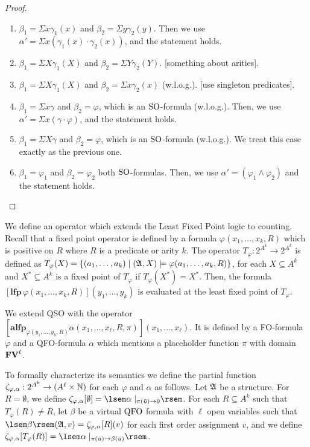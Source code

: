 \begin{proof}
\begin{enumerate}
		\begin{enumerate}
			\item $\beta_1 = \Sigma x \gamma_1(x)$ and $\beta_2 = \Sigma y \gamma_2(y)$. Then we use $\alpha' = \Sigma x(\gamma_1(x)\cdot\gamma_2(x))$, and the statement holds.
			\item $\beta_1 = \Sigma X \gamma_1(X)$ and $\beta_2 = \Sigma Y \gamma_2(Y)$. [something about arities].
			\item $\beta_1 = \Sigma X \gamma_1(X)$ and $\beta_2 = \Sigma x \gamma_2(x)$ (w.l.o.g.). [use singleton predicates].
			\item $\beta_1 = \Sigma x \gamma$ and $\beta_2 = \varphi$, which is an ${\rm SO}$-formula (w.l.o.g.). Then, we use $\alpha' = \Sigma x (\gamma \cdot \varphi)$, and the statement holds.
			\item $\beta_1 = \Sigma X \gamma$ and $\beta_2 = \varphi$, which is an ${\rm SO}$-formula (w.l.o.g.). We treat this case exactly as the previous one.
			\item $\beta_1 = \varphi_1$ and $\beta_2 = \varphi_2$ both ${\rm SO}$-formulas. Then, we use $\alpha' = (\varphi_1 \wedge \varphi_2)$ and the statement holds.
		\end{enumerate}
	\end{enumerate}
\end{proof}

We define an operator which extends the Least Fixed Point logic to counting. Recall that a fixed point operator is defined by a formula $\varphi(x_1,\ldots,x_k,R)$ which is positive on $R$ where $R$ is a predicate or arity $k$. The operator $T_{\varphi}:2^{A^k} \to 2^{A^k}$ is defined as $T_{\varphi}(X) = \{(a_1,\ldots,a_k)\mid (\mathfrak{A},X)\models \varphi(a_1,\ldots,a_k,R) \}$, for each $X\subseteq A^k$ and $X^*\subseteq A^k$ is a fixed point of $T_{\varphi}$ if $T_{\varphi}(X^*) = X^*$. Then, the formula $[\textbf{lfp}\,\varphi(x_1,\ldots,x_k,R)](y_1,\ldots,y_k)$ is evaluated at the least fixed point of $T_{\varphi}$.

We extend QSO with the operator $[\textbf{alfp}_{\varphi(y_1,\ldots,y_k,R)}\alpha(x_1,\ldots,x_{\ell},R,\pi)](x_1,\ldots,x_{\ell})$. It is defined by a FO-formula $\varphi$ and a QFO-formula $\alpha$ which mentions a placeholder function $\pi$ with domain $\mathbf{FV}^{\ell}$. 

To formally characterize its semantics we define the partial function $\zeta_{\varphi,\alpha}:2^{A^k} \to (A^{\ell}\times\mathbb{N})$ for each $\varphi$ and $\alpha$ as follows. Let $\mathfrak{A}$ be a structure. For $R = \emptyset$, we define $\zeta_{\varphi,\alpha}[\emptyset] = \sem{\alpha\mid_{\pi(\bar{u})\to 0}}$. For each $R \subseteq A^k$ such that $T_{\varphi}(R) \neq R$, let $\beta$ be a virtual ${\rm QFO}$ formula with $\ell$ open variables such that $\sem{\beta}(\A,v) = \zeta_{\varphi,\alpha}[R](v)$ for each first order assignment $v$, and we define $\zeta_{\varphi,\alpha}[T_{\varphi}(R)] = \sem{\alpha\mid_{\pi(\bar{u})\to\beta(\bar{u})}}$.

